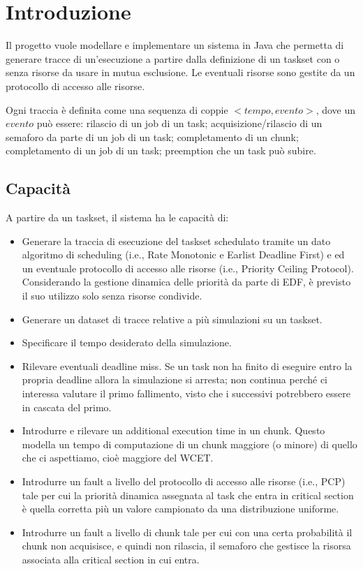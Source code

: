 \chapter{Introduzione}
Il progetto vuole modellare e implementare un sistema in Java che permetta di generare tracce di un'esecuzione a partire dalla definizione di un taskset con o senza risorse da usare in mutua esclusione. Le eventuali risorse sono gestite da un protocollo di accesso alle risorse.

Ogni traccia è definita come una sequenza di coppie $<tempo, evento>$, dove un $evento$ può essere: rilascio di un job di un task; acquisizione/rilascio di un semaforo da parte di un job di un task; completamento di un chunk; completamento di un job di un task; preemption che un task può subire.

\section{Capacità}
A partire da un taskset, il sistema ha le capacità di:
\begin{itemize}
    \item Generare la traccia di esecuzione del taskset schedulato tramite un dato algoritmo di scheduling (i.e., Rate Monotonic e Earlist Deadline First) e ed un eventuale protocollo di accesso alle risorse (i.e., Priority Ceiling Protocol). Considerando la gestione dinamica delle priorità da parte di EDF, è previsto il suo utilizzo solo senza risorse condivide.
    \item Generare un dataset di tracce relative a più simulazioni su un taskset.
    \item Specificare il tempo desiderato della simulazione.
    \item Rilevare eventuali deadline miss. Se un task non ha finito di eseguire entro la propria deadline allora la simulazione si arresta; non continua perché ci interessa valutare il primo fallimento, visto che i successivi potrebbero essere in cascata del primo.
    \item Introdurre e rilevare un additional execution time in un chunk. Questo modella un tempo di computazione di un chunk maggiore (o minore) di quello che ci aspettiamo, cioè maggiore del WCET.
    \item Introdurre un fault a livello del protocollo di accesso alle risorse (i.e., PCP) tale per cui la priorità dinamica assegnata al task che entra in critical section è quella corretta più un valore campionato da una distribuzione uniforme.
    \item Introdurre un fault a livello di chunk tale per cui con una certa probabilità il chunk non acquisisce, e quindi non rilascia, il semaforo che gestisce la risorsa associata alla critical section in cui entra.
\end{itemize}

